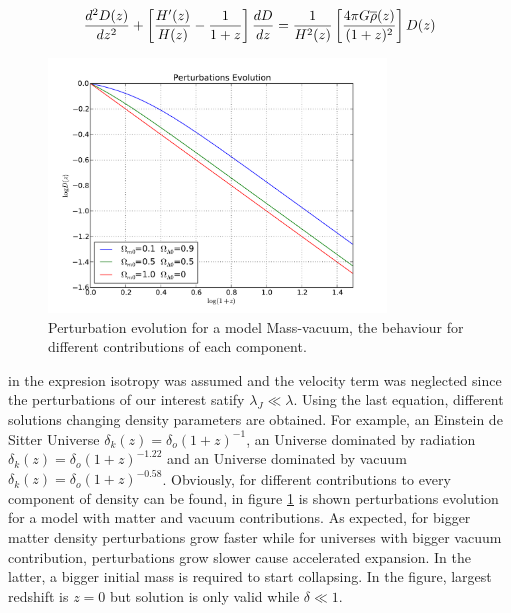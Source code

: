 \[
\frac{d^2D(z)}{dz^2}+\left[ \frac{H'(z)}{H(z)} -\frac{1}{1+z}\right]\frac{d D}{d z}
= \frac{1}{H^2(z)}\left[ \frac{4\pi G\overline{\rho}(z)}{(1+z)^2} \right]D(z)
\]

\begin{figure}[htbp]
       \centering
               \includegraphics[width=0.8\textwidth]{Images/chapter2/masavacio.pdf}
       \caption{\small Perturbation evolution for a model Mass-vacuum, the behaviour
       for different contributions of each component. }
       \label{masavacio}
 \end{figure}

in the expresion isotropy was assumed and the velocity term was neglected
since the perturbations of our interest satify $\lambda_J \ll \lambda$.
Using the last equation, different solutions changing density parameters
are obtained. For example, an Einstein de Sitter Universe  $\delta_k(z)=\delta_o(1+z)^{-1}$,  
an Universe dominated by radiation $\delta_k(z)=\delta_o(1+z)^{-1.22}$ and
an Universe dominated by vacuum $\delta_k(z)=\delta_o(1+z)^{-0.58}$. 
Obviously, for different contributions to every component of density can be found,
in figure \ref{masavacio} is shown perturbations evolution for a model with
matter and vacuum contributions. As expected, for bigger matter density
perturbations grow faster while for universes with bigger vacuum contribution, 
perturbations grow slower cause accelerated expansion. In the latter, a bigger
initial mass is required to start collapsing. In the figure, largest redshift
is $z=0$ but solution is only valid while $\delta\ll 1$. 

